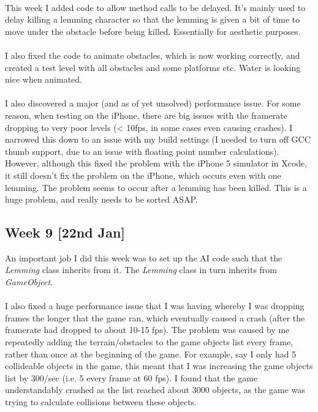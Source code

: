 \documentclass[a4paper,oneside]{report}
\begin{document}
\paragraph{} This week I added code to allow method calls to be delayed. It’s mainly used to delay killing a lemming character so that the lemming is given a bit of time to move under the obstacle before being killed. Essentially for aesthetic purposes.

\paragraph{} I also fixed the code to animate obstacles, which is now working correctly, and created a test level with all obstacles and some platforms etc. Water is looking nice when animated.

\paragraph{} I also discovered a major (and as of yet unsolved) performance issue. For some reason, when testing on the iPhone, there are big issues with the framerate dropping to very poor levels (< 10fps, in some cases even causing crashes). I narrowed this down to an issue with my build settings (I needed to turn off GCC thumb support, due to an issue with floating point number calculations). However, although this fixed the problem with the iPhone 5 simulator in Xcode, it still doesn’t fix the problem on the iPhone, which occurs even with one lemming. The problem seems to occur after a lemming has been killed. This is a huge problem, and really needs to be sorted ASAP.



\subsection{Week 9 [22nd Jan]}

An important job I did this week was to set up the AI code such that the \emph{Lemming} class inherits from it. The \emph{Lemming} class in turn inherits from \emph{GameObject}.

\paragraph{} I also fixed a huge performance issue that I was having whereby I was dropping frames the longer that the game ran, which eventually caused a crash (after the framerate had dropped to about 10-15 fps). The problem was caused by me repeatedly adding the terrain/obstacles to the game objects list every frame, rather than once at the beginning of the game. For example, say I only had 5 collideable objects in the game, this meant that I was increasing the game objects list by 300/sec (i.e. 5 every frame at 60 fps). I found that the game understandably crashed as the list reached about 3000 objects, as the game was trying to calculate collisions between these objects. 
\end{document}
